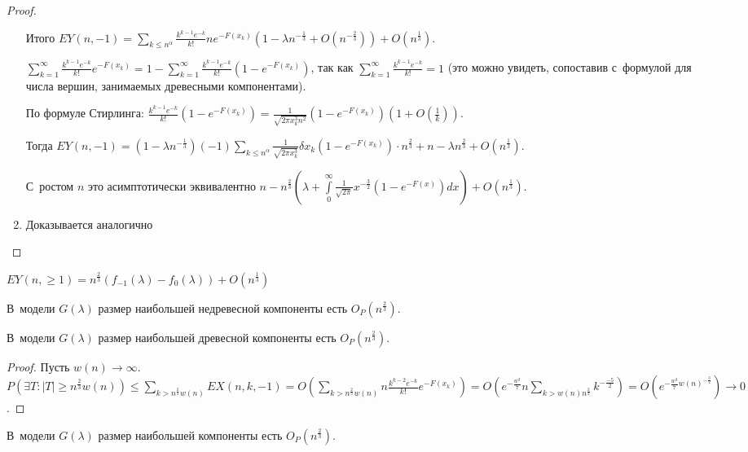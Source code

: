 \documentclass{article}
\begin{document}
\begin{proof}
\begin{enumerate}
			Итого $EY(n, -1) = \sum\limits_{k \le n^\alpha} \frac{k^{k-1} e^{-k}}{k!} n
			e^{-F(x_k)} (1  - \lambda n^{-\frac{1}{3}} + O(n^{-\frac{2}{3}})) + O(n^\frac{1}{3})$.

			$\sum\limits_{k=1}^\infty \frac{k^{k-1} e^{-k}}{k!} e^{-F(x_k)} = 1 - \sum\limits_{k=1}^\infty
			\frac{k^{k-1} e^{-k}}{k!} (1 - e^{-F(x_k)})$, так как $\sum\limits_{k=1}^\infty \frac{k^{k-1}
			e^{-k}}{k!} = 1$ (это можно увидеть, сопоставив с~формулой для числа вершин, занимаемых
			древесными компонентами).

			По формуле Стирлинга: $\frac{k^{k-1} e^{-k}}{k!} (1 - e^{-F(x_k)}) = \frac{1}{\sqrt{2\pi x_k^3
			n^2}}(1 - e^{-F(x_k)})(1 + O(\frac{1}{k}))$.

			Тогда $EY(n, -1) = (1 - \lambda n^{-\frac{1}{3}}) (-1) \sum\limits_{k \le n^\alpha}
			\frac{1}{\sqrt{2\pi x_k^3}} \delta x_k (1 - e^{-F(x_k)}) \cdot n^\frac{2}{3} + n - \lambda
			n^\frac{2}{3} + O(n^\frac{1}{3})$.

			С~ростом $n$ это асимптотически эквивалентно $n - n^\frac{2}{3}(\lambda + \int\limits_0^\infty
			\frac{1}{\sqrt{2\pi}} x^{-\frac{3}{2}} (1 - e^{-F(x)}) dx) + O(n^\frac{1}{3})$.
		\item Доказывается аналогично
	\end{enumerate}
\end{proof}

\begin{corollary}
	$EY(n, \ge 1) = n^\frac{2}{3}(f_{-1}(\lambda) - f_0(\lambda)) + O(n^\frac{1}{3})$
\end{corollary}
\begin{corollary}
	В~модели $G(\lambda)$ размер наибольшей недревесной компоненты есть $O_P(n^\frac{2}{3})$.
\end{corollary}

\begin{lemma}
	В~модели $G(\lambda)$ размер наибольшей древесной компоненты есть $O_P(n^\frac{2}{3})$.
\end{lemma}
\begin{proof}
	Пусть $w(n) \rightarrow \infty$. $P(\exists T: |T| \ge n^\frac{2}{3} w(n)) \le \sum\limits_{k >
	n^\frac{2}{3} w(n)} EX(n, k, -1) = O\left(\sum\limits_{k > n^\frac{2}{3} w(n)} n \frac{k^{k-2}
	e^{-k}}{k!} e^{-F(x_k)}\right) = O\left(e^{-\frac{w^3}{7}} n \sum\limits_{k > w(n) n^\frac{2}{3}}
	k^{-\frac{-5}{2}}\right) = O\left(e^{-\frac{w^3}{7} w(n)^{-\frac{3}{2}}}\right) \rightarrow 0$.
\end{proof}

\begin{corollary}
	В~модели $G(\lambda)$ размер наибольшей компоненты есть $O_P(n^\frac{2}{3})$.
\end{corollary}
\end{document}

